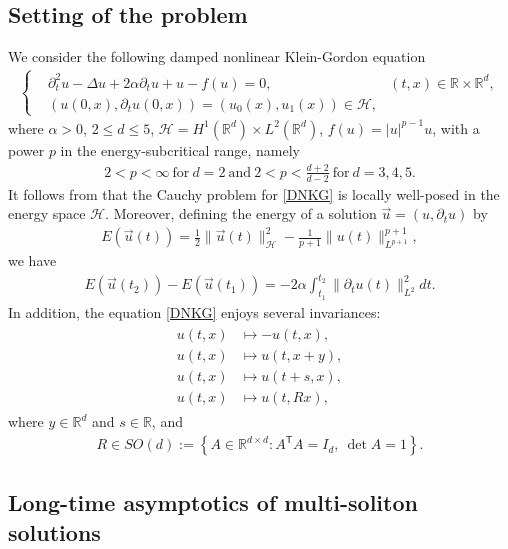 \documentclass[reqno]{amsart}
\theoremstyle{plain}
\theoremstyle{definition}
\numberwithin{equation}{section}
\renewcommand{\r}{\right}
\begin{document}
\subsection{Setting of the problem}
We consider the following damped nonlinear Klein-Gordon equation
\begin{align}
\label{DNKG}
\tag{DNKG}
	\left\{
	\begin{aligned}
		&\partial_{t}^2u-\Delta u+2\alpha \partial_{t}u+u-f(u)=0, & (t,x) \in \mathbb{R} \times \mathbb{R}^d,
		\\
		&\left(u(0,x),{\partial}_tu(0,x)\right)=\left(u_{0}(x), u_1(x)\right)\in \mathcal{H},
	\end{aligned}
	\r.
\end{align}
where $\alpha>0$, $2\leq d\leq 5$,  $\mathcal{H}=H^1(\mathbb{R}^d)\times L^2(\mathbb{R}^d)$, $f(u)=|u|^{p-1}u$, with a power $p$ in  the energy-subcritical range, namely
\begin{align*}
2<p<\infty \ \mbox{for}\ d=2\ \mbox{and}\ 2<p<\frac{d+2}{d-2}\ \mbox{for}\ d=3,4,5.
\end{align*}
It follows from \cite{BRS} that the Cauchy problem for \eqref{DNKG} is locally well-posed in the energy space $\mathcal{H}$. Moreover, defining the energy of a solution $\vec{u}=(u, {\partial}_tu)$ by
\begin{align*}
E(\vec{u}(t))=\frac{1}{2}\|\vec{u}(t)\|_{\mathcal{H}}^2-\frac{1}{p+1}\| u(t)\|_{L^{p+1}}^{p+1},
\end{align*}
we have
\begin{align}\label{energydecay}
E(\vec{u}(t_2))-E(\vec{u}(t_1))=-2\alpha \int_{t_1}^{t_2} \| {\partial}_tu(t)\|_{L^2}^2dt.
\end{align}
In addition, the equation \eqref{DNKG} enjoys several invariances:
\begin{align}\label{invariance}
\begin{aligned}
u(t,x)&\mapsto -u(t,x),
\\
u(t,x)&\mapsto u(t,x+y),
\\
u(t,x)&\mapsto u(t+s,x),
\\
u(t,x)&\mapsto u(t,Rx),
\end{aligned}
\end{align}
where $y\in \mathbb{R}^d$ and $s\in \mathbb{R}$, and 
\begin{align*}
R\in SO(d):=\left\{A\in\mathbb{R}^{d\times d}:A^{\mathsf T}A=I_d,\ \det A=1\right\}.
\end{align*}


\subsection{Long-time asymptotics of multi-soliton solutions}
\end{document}
